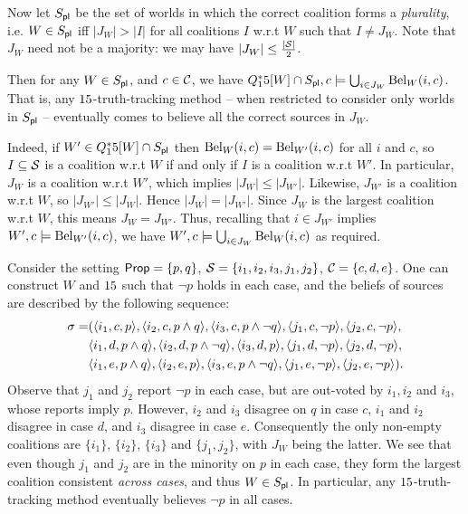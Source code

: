 Now let $S_{\mathsf{pl}}$ be the set of worlds in which the correct coalition
forms a \emph{plurality}, i.e. $W \in S_{\mathsf{pl}}$ iff $|J_W| > |I|$ for all
coalitions $I$ w.r.t $W$ such that $I \ne J_W$. Note that $J_W$ need not be a
majority: we may have $|J_W| \le \frac{|\mathcal{S}|}{2}$.

Then for any $W \in S_{\mathsf{pl}}$, and $c \in \mathcal{C}$, we have $Q^*_15[W] \cap
S_{\mathsf{pl}}, c \models \bigcup_{i \in J_W}{\operatorname{Bel}_{{W}}({i}, {c})}$. That is, any
$15$-truth-tracking method -- when restricted to consider only worlds in
$S_{\mathsf{pl}}$ -- eventually comes to believe all the correct sources in $J_W$.

Indeed, if $W' \in Q^*_15[W] \cap S_{\mathsf{pl}}$ then $\operatorname{Bel}_{{W}}({i}, {c}) =
\operatorname{Bel}_{{W'}}({i}, {c})$ for all $i$ and $c$, so $I \subseteq \mathcal{S}$ is a coalition
w.r.t $W$ if and only if $I$ is a coalition w.r.t $W'$. In particular, $J_W$ is
a coalition w.r.t $W'$, which implies $|J_W| \le |J_{W'}|$. Likewise, $J_{W'}$
is a coalition w.r.t $W$, so $|J_{W'}| \le |J_W|$. Hence $|J_W| = |J_{W'}|$.
Since $J_W$ is the largest coalition w.r.t $W$, this means $J_W = J_{W'}$.
Thus, recalling that $i \in J_{W'}$ implies $W', c \models \operatorname{Bel}_{{W'}}({i}, {c})$, we
have $W', c \models \bigcup_{i \in J_W}{\operatorname{Bel}_{{W}}({i}, {c})}$ as required.

\begin{example}
    Consider the setting $\mathsf{Prop} = \{p, q\}$, $\mathcal{S} =
    \{i_1,i_2,i_3,j_1,j_2\}$, $\mathcal{C} = \{c,d,e\}$. One can construct $W$ and
    $15$ such that $\neg{p}$ holds in each case, and the beliefs of sources are
    described by the following sequence:
    \begin{align*}
      \sigma =&
      (\langle {i_1, c, p} \rangle,
      \langle {i_2, c, p \land q} \rangle,
      \langle {i_3, c, p \land \neg{q}} \rangle,
      \langle {j_1, c, \neg{p}} \rangle,
      \langle {j_2, c, \neg{p}} \rangle,
      \\
      &
      \langle {i_1, d, p \land q} \rangle,
      \langle {i_2, d, p \land \neg{q}} \rangle,
      \langle {i_3, d, p} \rangle,
      \langle {j_1, d, \neg{p}} \rangle,
      \langle {j_2, d, \neg{p}} \rangle,
      \\
      &
      \langle {i_1, e, p \land q} \rangle,
      \langle {i_2, e, p} \rangle,
      \langle {i_3, e, p \land \neg{q}} \rangle,
      \langle {j_1, e, \neg{p}} \rangle,
      \langle {j_2, e, \neg{p}} \rangle).
    \end{align*}
    Observe that $j_1$ and $j_2$ report $\neg{p}$ in each case, but
    are out-voted by $i_1, i_2$ and $i_3$, whose reports imply $p$.
    However, $i_2$ and $i_3$ disagree on $q$ in case $c$, $i_1$ and
    $i_2$ disagree in case $d$, and $i_3$ disagree in case $e$.
    Consequently the only non-empty coalitions are $\{i_1\}$,
    $\{i_2\}$, $\{i_3\}$ and $\{j_1, j_2\}$, with $J_W$ being the
    latter. We see that even though $j_1$ and $j_2$ are in the
    minority on $p$ in each case, they form the largest coalition
    consistent \emph{across cases}, and thus $W \in S_{\mathsf{pl}}$. In
    particular, any $15$-truth-tracking method eventually believes
    $\neg{p}$ in all cases.
\end{example}

